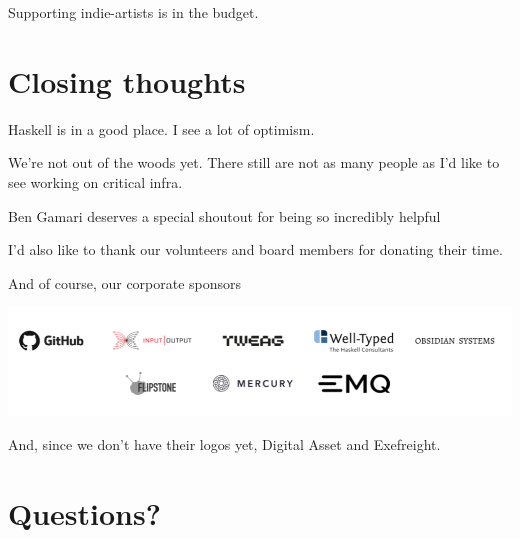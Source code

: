 \documentclass[tikz]{beamer}
\theoremstyle{definition}
\begin{document}
\frame
{ 
	Supporting indie-artists is in the budget. 
} 

\section{Closing thoughts}

\frame
{ 
	Haskell is in a good place. I see a lot of optimism. 

}

\frame
{ 
	We're not out of the woods yet. There still are not as many people as I'd like to see working on critical infra. 
} 

\frame
{ 
	Ben Gamari deserves a special shoutout for being so incredibly helpful 
} 

\frame
{ 
	I'd also like to thank our volunteers and board members for donating their time. 
} 

\frame
{ 
	And of course, our corporate sponsors
} 

\frame
{ 
	\begin{center}
	\includegraphics[scale=0.3]{sponsors.png}
	\end{center}
} 

\frame
{ 
	And, since we don't have their logos yet, Digital Asset and Exefreight.
} 

\section{Questions?}
\end{document}
